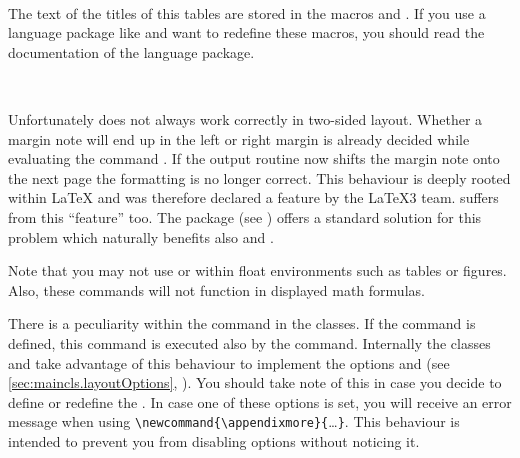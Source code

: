 \begin{Declaration}
  \\
\end{Declaration}
%
%
The text of the titles of this tables are stored in the macros
 and . If you use a
language package like  and want to redefine these
macros, you should read the documentation of the language package.
%
%
%

\begin{Declaration}
  \\
\end{Declaration}%
%
%
Unfortunately  does not always work correctly in
two-sided layout. Whether a margin note will end up in the left
or right margin is already decided while evaluating the command
. If the output routine now shifts the margin note onto the
next page the formatting is no longer correct. This behaviour is deeply rooted
within {\LaTeX} and was therefore declared a feature by the {\LaTeX}3
team.  suffers from this ``feature'' too. The package
 (see \cite{package:mparhack}) offers
a standard solution for this problem which naturally benefits also
 and .

Note that you may not use  or  within float
environments such as tables or figures. Also, these commands will not function
in displayed math formulas.%
%
%
%


\begin{Declaration}
\end{Declaration}%
%
There is a peculiarity within the  command in the
{\KOMAScript} classes. If the command  is defined,
this command is executed also by the 
command. Internally the {\KOMAScript} classes  and
 take advantage of this behaviour to implement the
options  and  (see
\autoref{sec:maincls.layoutOptions},
). You should take
note of this in case you decide to define or redefine the
. In case one of these options is set, you will
receive an error message when using
\verb|\newcommand{\appendixmore}{|\dots\verb|}|. This behaviour is
intended to prevent you from disabling options without noticing it.

